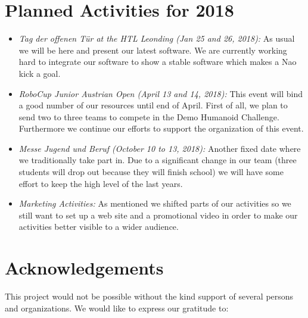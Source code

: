 \documentclass[11pt]{article}
\begin{document}
\section{Planned Activities for 2018}

\begin{itemize}
	\item {\em Tag der offenen Tür at the HTL Leonding (Jan 25 and 26, 2018):} As usual we will be here and present our latest software. We are currently working hard to integrate our software to show a stable software which makes a Nao kick a goal.
	
	\item {\em RoboCup Junior Austrian Open (April 13 and 14, 2018):}	This event will bind a good number of our resources until end of April. First of all, we plan to send two to three teams to compete in the Demo Humanoid Challenge. Furthermore we continue our efforts to support the organization of this event.
	
	\item {\em Messe Jugend und Beruf (October 10 to 13, 2018):} Another fixed date where we traditionally take part in. Due to a significant change in our team (three students will drop out because they will finish school) we will have some effort to keep the high level of the last years.
	
	\item {\em Marketing Activities:} As mentioned we shifted parts of our activities so we still want to set up a web site and a promotional video in order to make our activities better visible to a wider audience.
\end{itemize}

\section{Acknowledgements}
This project would not be possible without the kind support of several persons and organizations. We would like to express our gratitude to:
\end{document}
